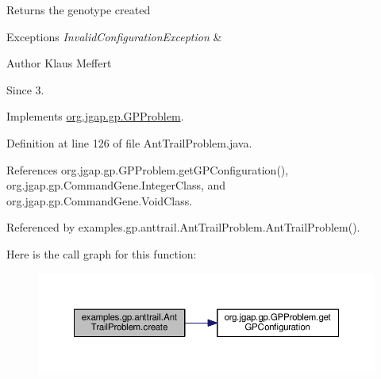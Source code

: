 \begin{DoxyReturn}{Returns}
the genotype created 
\end{DoxyReturn}

\begin{DoxyExceptions}{Exceptions}
{\em Invalid\-Configuration\-Exception} & \\
\hline
\end{DoxyExceptions}
\begin{DoxyAuthor}{Author}
Klaus Meffert 
\end{DoxyAuthor}
\begin{DoxySince}{Since}
3. 
\end{DoxySince}


Implements \hyperlink{classorg_1_1jgap_1_1gp_1_1_g_p_problem_a9c453825ecc8d4f20a6cc17c6c5d78cb}{org.\-jgap.\-gp.\-G\-P\-Problem}.



Definition at line 126 of file Ant\-Trail\-Problem.\-java.



References org.\-jgap.\-gp.\-G\-P\-Problem.\-get\-G\-P\-Configuration(), org.\-jgap.\-gp.\-Command\-Gene.\-Integer\-Class, and org.\-jgap.\-gp.\-Command\-Gene.\-Void\-Class.



Referenced by examples.\-gp.\-anttrail.\-Ant\-Trail\-Problem.\-Ant\-Trail\-Problem().



Here is the call graph for this function\-:
\nopagebreak
\begin{figure}[H]
\begin{center}
\leavevmode
\includegraphics[width=350pt]{classexamples_1_1gp_1_1anttrail_1_1_ant_trail_problem_ad599d0c5965439a824fe20fd900348f2_cgraph}
\end{center}
\end{figure}


